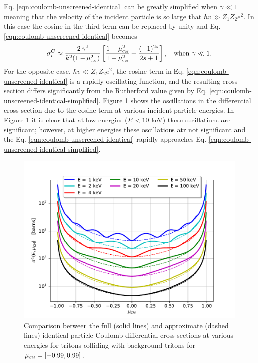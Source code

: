 Eq. \eqref{eqn:coulomb-unscreened-identical} can be greatly simplified when $\gamma \ll 1$ meaning that the velocity of the incident particle is so large that $\hbar v \gg Z_1 Z_2 e^2$. In this case the cosine in the third term can be replaced by unity and Eq. \eqref{eqn:coulomb-unscreened-identical} becomes
\begin{equation} \label{eqn:coulomb-unscreened-identical-simplified}
   \sigma_{i}^{C} \approx \dfrac{2 \, \gamma^2}{k^2 (1 - \mucm^2)} \left[\dfrac{1+ \mucm^2}{1-\mucm^2} + \dfrac{(-1)^{2s}}{2s+1}\right], \quad \text{when} \,\, \gamma \ll 1.
\end{equation}
For the opposite case, $\hbar v \ll Z_1 Z_2 e^2$, the cosine term in Eq. \eqref{eqn:coulomb-unscreened-identical} is a rapidly oscillating function, and the resulting cross section differs significantly from the Rutherford value given by Eq. \eqref{eqn:coulomb-unscreened-identical-simplified}. Figure \ref{fig:coulomb-identical-2d} shows the oscillations in the differential cross section due to the cosine term at various incident particle energies. In Figure \ref{fig:coulomb-identical-2d} it is clear that at low energies ($E < 10$ keV) these oscillations are significant; however, at higher energies these oscillations atr not significant and the Eq. \eqref{eqn:coulomb-unscreened-identical} rapidly approaches Eq. \eqref{eqn:coulomb-unscreened-identical-simplified}.

\begin{figure}[!htb]
    \centering
    \includegraphics[]{../figures/interaction_physics/sigma-Ci-2d.pdf}
    \caption{Comparison between the full (solid lines) and approximate (dashed lines) identical particle Coulomb differential cross sections at various energies for tritons colliding with background tritons for $\mucm = [-0.99,0.99]$.}
    \label{fig:coulomb-identical-2d}
\end{figure}

